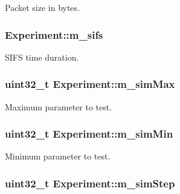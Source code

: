 Packet size in bytes. 

\subsubsection[{\texorpdfstring{m\+\_\+sifs}{m_sifs}}]{ Experiment\+::m\+\_\+sifs}\hypertarget{classExperiment_a4da00b956aa11609381dae2878c61bed}{}\label{classExperiment_a4da00b956aa11609381dae2878c61bed}


S\+I\+FS time duration. 

\subsubsection[{\texorpdfstring{m\+\_\+sim\+Max}{m_simMax}}]{\setlength{\rightskip}{0pt plus 5cm}uint32\+\_\+t Experiment\+::m\+\_\+sim\+Max}\hypertarget{classExperiment_a8eb0623f0942827bc464344394072ebb}{}\label{classExperiment_a8eb0623f0942827bc464344394072ebb}


Maximum parameter to test. 

\subsubsection[{\texorpdfstring{m\+\_\+sim\+Min}{m_simMin}}]{\setlength{\rightskip}{0pt plus 5cm}uint32\+\_\+t Experiment\+::m\+\_\+sim\+Min}\hypertarget{classExperiment_a1e89e71ab70949905316be28953a792e}{}\label{classExperiment_a1e89e71ab70949905316be28953a792e}


Minimum parameter to test. 

\subsubsection[{\texorpdfstring{m\+\_\+sim\+Step}{m_simStep}}]{\setlength{\rightskip}{0pt plus 5cm}uint32\+\_\+t Experiment\+::m\+\_\+sim\+Step}\hypertarget{classExperiment_a467fcd8d0cf8bd7a76b399a6cd649a35}{}\label{classExperiment_a467fcd8d0cf8bd7a76b399a6cd649a35}


